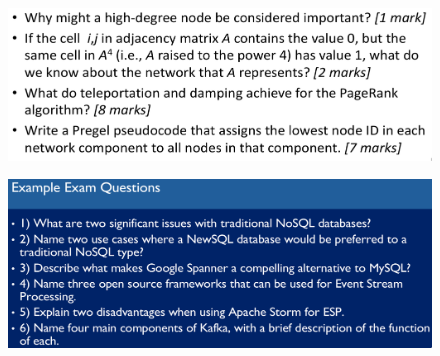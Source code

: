 \documentclass[a4paper]{article}
\begin{document}
\begin{multicols}{3}
\begin{figure}[H]
    \includegraphics[width=\linewidth]{ExampleExamQuestions04.png}
    \label{fig:examquestion04}
\end{figure}

\begin{figure}[H]
    \includegraphics[width=\linewidth]{ExampleExamQuestions05.png}
    \label{fig:examquestion05}
\end{figure}

\vspace*{\fill}
    \pagebreak
\end{multicols}
\end{document}
